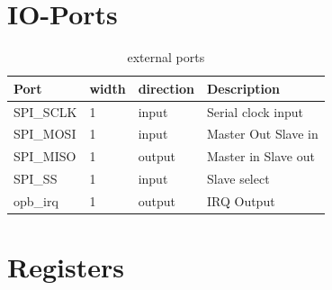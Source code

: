 \chapter{IO-Ports}
\begin{table} [h]
	\centering
		\begin{tabularx} {160mm}{|l|l|l|X|} \hline
		\textbf{Port}		& \textbf{width}	& \textbf{direction}	& \textbf{Description} \\ \hline
		SPI\_SCLK				& 1		& input			& Serial clock input	\\
		SPI\_MOSI				& 1		& input			& Master Out Slave in \\
		SPI\_MISO				& 1 	& output		& Master in Slave out	\\
		SPI\_SS					& 1		& input			& Slave select				\\ \hline
		opb\_irq				& 1		& output		& IRQ Output					\\ \hline
		\end{tabularx}
	\caption{external ports}
	\label{tab:externalPorts}
\end{table}

\chapter{Registers}

